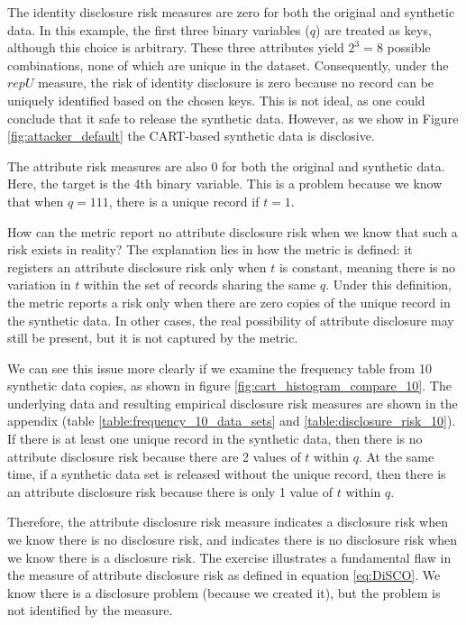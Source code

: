 \documentclass[a4paper,11pt]{style/uneceart}
\begin{document}
The identity disclosure risk measures are zero for both the original and synthetic data. In this example, the first three binary variables ($q$) are treated as keys, although this choice is arbitrary. These three attributes yield $2^3 = 8$ possible combinations, none of which are unique in the dataset. Consequently, under the $repU$ measure, the risk of identity disclosure is zero because no record can be uniquely identified based on the chosen keys. This is not ideal, as one could conclude that it safe to release the synthetic data. However, as we show in Figure \ref{fig:attacker_default} the CART-based synthetic data is disclosive.

The attribute risk measures are also 0 for both the original and synthetic data.  Here, the target is the 4th binary variable.  This is a problem because we know that when $q=111$, there is a unique record if $t=1$.  

How can the metric report no attribute disclosure risk when we know that such a risk exists in reality? The explanation lies in how the metric is defined: it registers an attribute disclosure risk only when $t$ is constant, meaning there is no variation in $t$ within the set of records sharing the same $q$. Under this definition, the metric reports a risk only when there are zero copies of the unique record in the synthetic data. In other cases, the real possibility of attribute disclosure may still be present, but it is not captured by the metric.


We can see this issue more clearly if we examine the frequency table from 10 synthetic data copies, as shown in figure \ref{fig:cart_histogram_compare_10}.  The underlying data and resulting empirical disclosure risk measures are shown in the appendix (table \ref{table:frequency_10_data_sets} and \ref{table:disclosure_risk_10}).  If there is at least one unique record in the synthetic data, then there is no attribute disclosure risk because there are 2 values of $t$ within $q$.  At the same time, if a synthetic data set is released without the unique record, then there is an attribute disclosure risk because there is only 1 value of $t$ within $q$.  

Therefore, the attribute disclosure risk measure indicates a disclosure risk when we know there is no disclosure risk, and indicates there is no disclosure risk when we know there is a disclosure risk.  The exercise illustrates a fundamental flaw in the measure of attribute disclosure risk as defined in equation \ref{eq:DiSCO}. We know there is a disclosure problem (because we created it), but the problem is not identified by the measure.  
\end{document}
